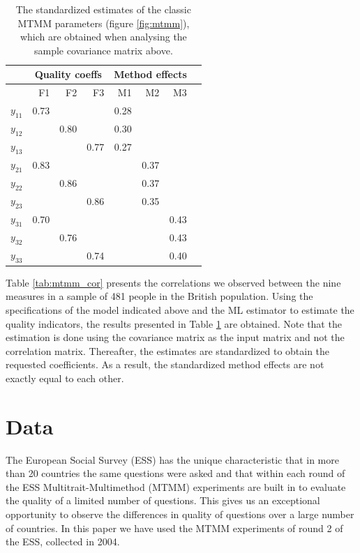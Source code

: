 \documentclass[a4paper,12pt]{article}
\begin{document}
\begin{table}[htb]\centering\caption{The standardized estimates of the classic MTMM parameters (figure \ref{fig:mtmm}), which are obtained when analysing the sample covariance matrix above.\label{tab:mtmm_results}}
\begin{tabular}{lrrrrrrr}
\hline
&   \multicolumn{3}{c}{Quality coeffs} & \multicolumn{3}{c}{Method effects} \\
\hline
    & F1 & F2 & F3 & M1 & M2 & M3 \\ 
 $y_{11}$ &   0.73& & & 0.28\\
$y_{12}$ &  & 0.80 & & 0.30\\
$y_{13}$ &  && 0.77 & 0.27\\
$y_{21}$ &   0.83 &&&& 0.37\\
$y_{22}$ &  & 0.86 &&& 0.37\\
$y_{23}$ &  && 0.86 && 0.35\\
$y_{31}$ &   0.70 &&&&& 0.43\\
$y_{32}$ &  & 0.76 &&&& 0.43\\
$y_{33}$ &  && 0.74 &&& 0.40\\
\hline
\end{tabular}
\end{table}

Table \ref{tab:mtmm_cor} presents the correlations we observed between the nine measures in a sample of 481 people in the British population. Using the specifications of the model indicated above and the ML estimator to estimate the quality indicators, the results presented in Table \ref{tab:mtmm_results} are obtained. Note that the estimation is done using the covariance matrix as the input matrix and not the correlation matrix. Thereafter, the estimates are standardized to obtain the requested coefficients. As a result, the standardized method effects are not exactly equal to each other.  

\clearpage
\fi
\section{Data}

The European Social Survey (ESS) has the unique characteristic that in more than 20 countries the same questions were asked and that within each round of the ESS Multitrait-Multimethod (MTMM) experiments are built in to evaluate the quality of a limited number of questions. This gives us an exceptional opportunity to observe the differences in quality of questions over a large number of countries. In this paper we have used the MTMM experiments of round 2 of the ESS, collected in 2004. 
\end{document}
